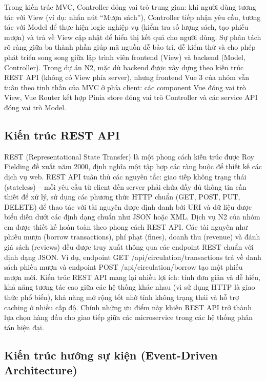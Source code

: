 Trong kiến trúc MVC, Controller đóng vai trò trung gian: khi người dùng tương tác với View (ví dụ: nhấn nút “Mượn sách”), Controller tiếp nhận yêu cầu, tương tác với Model để thực hiện logic nghiệp vụ (kiểm tra số lượng sách, tạo phiếu mượn) và trả về View cập nhật để hiển thị kết quả cho người dùng. Sự phân tách rõ ràng giữa ba thành phần giúp mã nguồn dễ bảo trì, dễ kiểm thử và cho phép phát triển song song giữa lập trình viên frontend (View) và backend (Model, Controller). Trong dự án N2, mặc dù backend được xây dựng theo kiến trúc REST API (không có View phía server), nhưng frontend Vue 3 của nhóm vẫn tuân theo tinh thần của MVC ở phía client: các component Vue đóng vai trò View, Vue Router kết hợp Pinia store đóng vai trò Controller và các service API đóng vai trò Model.

\subsection{Kiến trúc REST API}

REST (Representational State Transfer) là một phong cách kiến trúc được Roy Fielding đề xuất năm 2000, định nghĩa một tập hợp các ràng buộc để thiết kế các dịch vụ web. REST API tuân thủ các nguyên tắc: giao tiếp không trạng thái (stateless) – mỗi yêu cầu từ client đến server phải chứa đầy đủ thông tin cần thiết để xử lý, sử dụng các phương thức HTTP chuẩn (GET, POST, PUT, DELETE) để thao tác với tài nguyên được định danh bởi URI và dữ liệu được biểu diễn dưới các định dạng chuẩn như JSON hoặc XML. Dịch vụ N2 của nhóm em được thiết kế hoàn toàn theo phong cách REST API. Các tài nguyên như phiếu mượn (borrow transactions), phí phạt (fines), doanh thu (revenue) và đánh giá sách (reviews) đều được truy xuất thông qua các endpoint REST chuẩn với định dạng JSON. Ví dụ, endpoint GET /api/circulation/transactions trả về danh sách phiếu mượn và endpoint POST /api/circulation/borrow tạo một phiếu mượn mới. Kiến trúc REST API mang lại nhiều lợi ích: tính đơn giản và dễ hiểu, khả năng tương tác cao giữa các hệ thống khác nhau (vì sử dụng HTTP là giao thức phổ biến), khả năng mở rộng tốt nhờ tính không trạng thái và hỗ trợ caching ở nhiều cấp độ. Chính những ưu điểm này khiến REST API trở thành lựa chọn hàng đầu cho giao tiếp giữa các microservice trong các hệ thống phân tán hiện đại.

\subsection{Kiến trúc hướng sự kiện (Event-Driven Architecture)}


